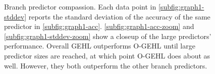 \begin{figure}[h]

  \caption{Branch predictor compassion.  Each data point in \ref{subfig:graph1-stddev} reports the standard deviation of the accuracy of the same predictor in \ref{subfig:graph1-acc}.  \ref{subfig:graph1-acc-zoom} and \ref{subfig:graph1-stddev-zoom} show a closeup of the large predictors' performance.  Overall GEHL outperforms O-GEHL until large predictor sizes are reached, at which point O-GEHL does about as well.  However, they both outperform the other branch predictors.}
  \label{fig:comparison}
\end{figure}

